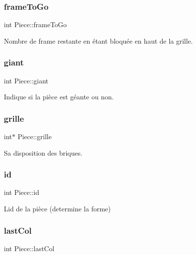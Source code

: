 \subsubsection{\texorpdfstring{frame\+To\+Go}{frameToGo}}
{\footnotesize\ttfamily int Piece\+::frame\+To\+Go}



Nombre de frame restante en étant bloquée en haut de la grille. 

\mbox{\label{struct_piece_ac3619bd3c5360a0979c7018a187107c0}} 
\subsubsection{\texorpdfstring{giant}{giant}}
{\footnotesize\ttfamily int Piece\+::giant}



Indique si la pièce est géante ou non. 

\mbox{\label{struct_piece_a37ac5e8ab5ac3980e9685b660c79e1cd}} 
\subsubsection{\texorpdfstring{grille}{grille}}
{\footnotesize\ttfamily int$\ast$ Piece\+::grille}



Sa disposition des briques. 

\mbox{\label{struct_piece_ac40cffee50da10a50361ff4791fdd528}} 
\subsubsection{\texorpdfstring{id}{id}}
{\footnotesize\ttfamily int Piece\+::id}



L\textquotesingle{}id de la pièce (determine la forme) 

\mbox{\label{struct_piece_a00c22a871e4431c2fe08184f13e96800}} 
\subsubsection{\texorpdfstring{last\+Col}{lastCol}}
{\footnotesize\ttfamily int Piece\+::last\+Col}



